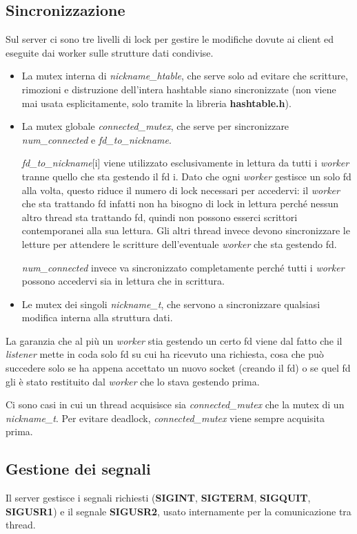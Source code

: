 \documentclass[a4paper]{article}
\theoremstyle{theorem}
\theoremstyle{remark}
\theoremstyle{definition}
\theoremstyle{corollary}
\theoremstyle{lemma}
\newcommand\file[1]{%
	\textbf{#1}}
\newcommand\codeName[1]{%
	\textit{#1}}
\begin{document}
\subsection{Sincronizzazione}\label{sincronizzazione}
Sul server ci sono tre livelli di lock per gestire le modifiche dovute ai client ed eseguite dai worker sulle strutture dati condivise.
\begin{itemize}
	\item La mutex interna di \codeName{nickname\_htable}, che serve solo ad evitare che scritture, rimozioni e distruzione dell'intera hashtable siano sincronizzate (non viene mai usata esplicitamente, solo tramite la libreria \file{hashtable.h}).
	\item La mutex globale \codeName{connected\_mutex}, che serve per sincronizzare \codeName{num\_connected} e
\codeName{fd\_to\_nickname}.

\codeName{fd\_to\_nickname}[i] viene utilizzato esclusivamente in lettura da tutti i \codeName{worker} tranne quello che sta gestendo il fd i. Dato che ogni \codeName{worker} gestisce un solo fd alla volta, questo riduce il numero di lock necessari per accedervi: il \codeName{worker} che sta trattando fd infatti non ha bisogno di lock in lettura perché nessun altro thread sta trattando fd, quindi non possono esserci scrittori contemporanei alla sua lettura. Gli altri thread invece devono sincronizzare le letture per attendere le scritture dell'eventuale \codeName{worker} che sta gestendo fd.

\codeName{num\_connected} invece va sincronizzato completamente perché tutti i \codeName{worker} possono accedervi sia in lettura che in scrittura.
	\item Le mutex dei singoli \codeName{nickname\_t}, che servono a sincronizzare qualsiasi modifica interna alla struttura dati.
\end{itemize}
La garanzia che al più un \codeName{worker} stia gestendo un certo fd viene dal fatto che il \codeName{listener} mette in coda solo fd su cui ha ricevuto una richiesta, cosa che può succedere solo se ha appena accettato un nuovo socket (creando il fd) o se quel fd gli è stato restituito dal \codeName{worker} che lo stava gestendo prima.

Ci sono casi in cui un thread acquisisce sia \codeName{connected\_mutex} che la mutex di un \codeName{nickname\_t}. Per evitare deadlock, \codeName{connected\_mutex} viene sempre acquisita prima.

\subsection{Gestione dei segnali}\label{gestione-segnali}
Il server gestisce i segnali richiesti (\textbf{SIGINT}, \textbf{SIGTERM}, \textbf{SIGQUIT}, \textbf{SIGUSR1}) e il segnale \textbf{SIGUSR2}, usato internamente per la comunicazione tra thread.
\end{document}
